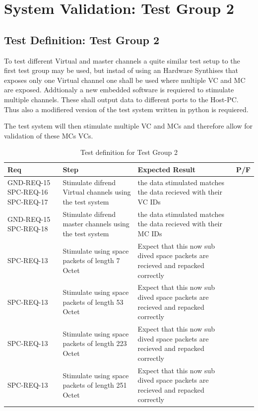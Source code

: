 \section{System Validation: Test Group 2}
\subsection{Test Definition: Test Group 2}
To test different Virtual and master channels a quite similar test setup to the first test group may be used, but instad of using an Hardware Synthises that exposes only one Virtual channel one shall be used where multiple VC and MC are exposed. Addtionaly a new embedded software is requiered to stimulate multiple channels. These shall output data to different ports to the Host-PC. Thus also a modifiered version of the test system written in python is requiered.

The test system will then stimulate multiple VC and MCs and therefore allow for validation of these MCs VCs.

\begin{table}[H]
	\begin{tabular}{|p{2.7cm}|p{6cm}|p{6cm}|p{1cm}|}
		\hline
		\textbf{Req} & \textbf{Step} & \textbf{Expected Result} & \textbf{P/F}\\
		\hline
		GND-REQ-15 SPC-REQ-16 SPC-REQ-17 & Stimulate difrend Virtual channels using the test system & the data stimulated matches the data recieved with their VC IDs& \\
		\hline
		GND-REQ-15 SPC-REQ-18 & Stimulate difrend master channels using the test system & the data stimulated matches the data recieved with their MC IDs& \\
		\hline
		SPC-REQ-13 & Stimulate using space packets of length 7 Octet & Expect that this now sub dived space packets are recieved and repacked correctly & \\
		\hline
		SPC-REQ-13 & Stimulate using space packets of length 53 Octet & Expect that this now sub dived space packets are recieved and repacked correctly & \\
		\hline
		SPC-REQ-13 & Stimulate using space packets of length 223 Octet & Expect that this now sub dived space packets are recieved and repacked correctly & \\
		\hline
		SPC-REQ-13 & Stimulate using space packets of length 251 Octet & Expect that this now sub dived space packets are recieved and repacked correctly & \\
		\hline
		
		
	\end{tabular}
	\caption{Test definition for Test Group 2}
	\label{tab:TestGroup2_testdef}
\end{table} 
